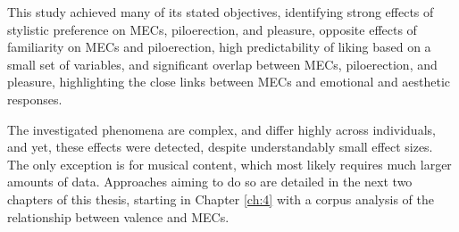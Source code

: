 This study achieved many of its stated objectives, identifying strong effects of stylistic preference on MECs, piloerection, and pleasure, opposite effects of familiarity on MECs and piloerection, high predictability of liking based on a small set of variables, and significant overlap between MECs, piloerection, and pleasure, highlighting the close links between MECs and emotional and aesthetic responses.

The investigated phenomena are complex, and differ highly across individuals, and yet, these effects were detected, despite understandably small effect sizes. The only exception is for musical content, which most likely requires much larger amounts of data. Approaches aiming to do so are detailed in the next two chapters of this thesis, starting in Chapter \ref{ch:4} with a corpus analysis of the relationship between valence and MECs.
